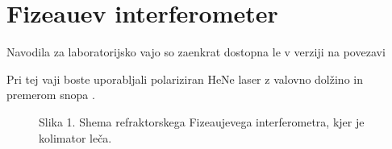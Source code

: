 \documentclass[letterpaper,10pt,english]{sphinxmanual}
\begin{document}
\chapter{Fizeauev interferometer}
\label{\detokenize{fizeau:fizeauev-interferometer}}\label{\detokenize{fizeau:fizeau}}\label{\detokenize{fizeau::doc}}
\sphinxAtStartPar
Navodila za laboratorijsko vajo so zaenkrat dostopna le v  verziji na povezavi 

\sphinxAtStartPar
Pri tej vaji boste uporabljali polariziran He\sphinxhyphen{}Ne laser z valovno dolžino  in premerom snopa .

\begin{figure}[htbp]
\centering
\capstart

\noindent{}
\caption{Slika 1. Shema refraktorskega Fizeau\sphinxhyphen{}jevega interferometra, kjer je kolimator leča.}\label{\detokenize{fizeau:id1}}\end{figure}
\end{document}
